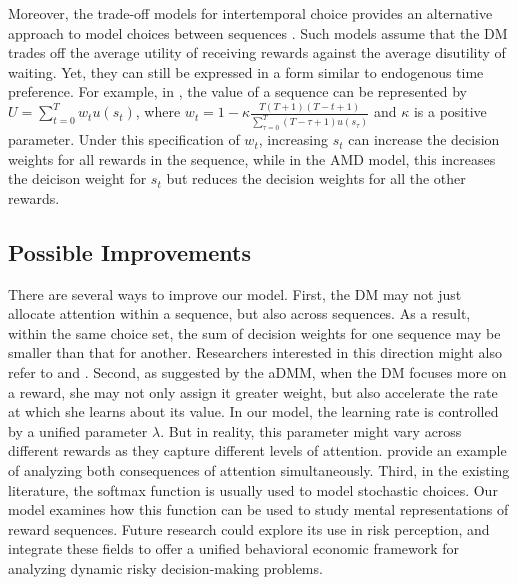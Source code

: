 \documentclass[
  12pt,
]{article}
\begin{document}
Moreover, the trade-off models for intertemporal choice provides an
alternative approach to model choices between sequences
\citep[\citet{scholten2016cumulative},
\citet{scholten2024unified}]{read2012tradeoffs}. Such models assume that
the DM trades off the average utility of receiving rewards against the
average disutility of waiting. Yet, they can still be expressed in a
form similar to endogenous time preference. For example, in
\citet{scholten2016cumulative}, the value of a sequence can be
represented by \(U=\sum_{t=0}^T w_tu(s_t)\), where
\(w_t=1-\kappa\frac{T(T+1)(T-t+1)}{\sum_{\tau=0}^T (T-\tau+1)u(s_\tau)}\)
and \(\kappa\) is a positive parameter. Under this specification of
\(w_t\), increasing \(s_t\) can increase the decision weights for all
rewards in the sequence, while in the AMD model, this increases the
deicison weight for \(s_t\) but reduces the decision weights for all the
other rewards.

\hypertarget{possible-improvements}{%
\subsection{Possible Improvements}\label{possible-improvements}}

There are several ways to improve our model. First, the DM may not just
allocate attention within a sequence, but also across sequences. As a
result, within the same choice set, the sum of decision weights for one
sequence may be smaller than that for another. Researchers interested in
this direction might also refer to \citet{manzini2014stochastic} and
\citet{gossner2021attention}. Second, as suggested by the aDMM, when the
DM focuses more on a reward, she may not only assign it greater weight,
but also accelerate the rate at which she learns about its value. In our
model, the learning rate is controlled by a unified parameter
\(\lambda\). But in reality, this parameter might vary across different
rewards as they capture different levels of attention.
\citet{leong2017dynamic} provide an example of analyzing both
consequences of attention simultaneously. Third, in the existing
literature, the softmax function is usually used to model stochastic
choices. Our model examines how this function can be used to study
mental representations of reward sequences. Future research could
explore its use in risk perception, and integrate these fields to offer
a unified behavioral economic framework for analyzing dynamic risky
decision-making problems.

\renewcommand\refname{Reference}
  
\end{document}
